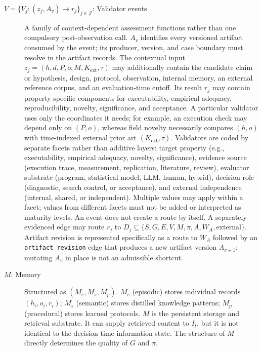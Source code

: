 \documentclass{article}
\begin{document}
\begin{description}
  \item[$V=\{V_j:(z_j,A_v)\rightarrow r_j\}_{j\in\mathcal J}$: Validator events] A family of context-dependent assessment functions rather than one compulsory post-observation call. $A_v$ identifies every versioned artifact consumed by the event; its producer, version, and case boundary must resolve in the artifact records. The contextual input
  $z_j=(h,d,P,o,M,K_{\mathrm{ext}},\tau)$ may additionally contain the candidate claim or hypothesis, design,
  protocol, observation, internal memory, an external reference corpus, and an evaluation-time
  cutoff. Its result $r_j$ may contain property-specific components for executability,
  empirical adequacy, reproducibility, novelty, significance, and acceptance. A particular
  validator uses only the coordinates it needs; for example, an execution check may depend only
  on $(P,o)$, whereas field novelty necessarily compares $(h,o)$ with time-indexed external
  prior art $(K_{\mathrm{ext}},\tau)$. Validators are coded by separate facets rather than
  additive layers: target property (e.g., executability, empirical adequacy, novelty,
  significance), evidence source (execution trace, measurement, replication, literature,
  review), evaluator substrate (program, statistical model, LLM, human, hybrid), decision role
  (diagnostic, search control, or acceptance), and external independence (internal, shared,
  or independent). Multiple values may apply within a facet; values from different facets
  must not be added or interpreted as maturity levels. An event does not create a route by
  itself. A separately evidenced edge may route $r_j$ to
  $D_j\subseteq\{S,G,E,V,M,\pi,A,W_A,\mathrm{external}\}$. Artifact revision is represented
  specifically as a route to $W_A$ followed by an \texttt{artifact\_revision} edge that produces
  a new artifact version $A_{v+1}$; mutating $A_v$ in place is not an admissible shortcut.

  \item[$M$: Memory] Structured as $(M_e, M_s, M_p)$. $M_e$ (episodic) stores individual records $(h_i, o_i, r_i)$; $M_s$ (semantic) stores distilled knowledge patterns; $M_p$ (procedural) stores learned protocols. $M$ is the persistent storage and retrieval substrate. It can supply retrieved content to $I_t$, but it is not identical to the decision-time information state. The structure of $M$ directly determines the quality of $G$ and $\pi$.


\end{description}
\end{document}
